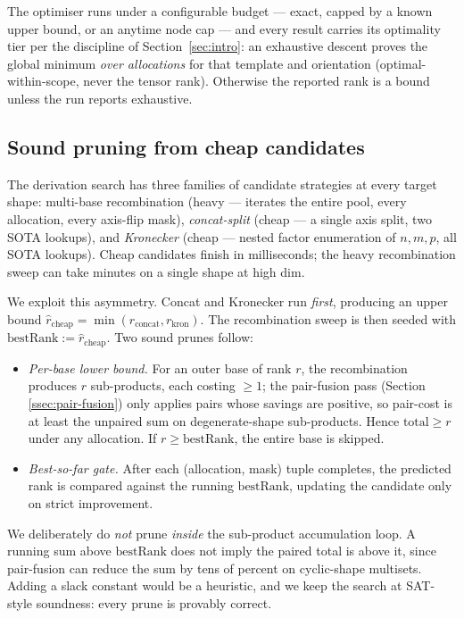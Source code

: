 The optimiser runs under a configurable budget --- exact, capped by a
known upper bound, or an anytime node cap --- and every result carries
its optimality tier per the discipline of Section~\ref{sec:intro}: an
exhaustive descent proves the global minimum \emph{over allocations} for
that template and orientation (optimal-within-scope, never the tensor
rank). Otherwise the reported rank is a bound unless the run reports
exhaustive.

\subsection{Sound pruning from cheap candidates}\label{ssec:cheap-pruning}

The derivation search has three families of candidate strategies
at every target shape: multi-base recombination (heavy --- iterates
the entire pool, every allocation, every axis-flip mask),
\emph{concat-split} (cheap --- a single axis split, two SOTA
lookups), and \emph{Kronecker} (cheap --- nested factor enumeration
of \(n, m, p\), all SOTA lookups). Cheap candidates finish in
milliseconds; the heavy recombination sweep can take minutes on a
single shape at high dim.

We exploit this asymmetry. Concat and Kronecker run \emph{first},
producing an upper bound \(\hat r_{\text{cheap}} = \min(r_{\text{concat}},
r_{\text{kron}})\). The recombination sweep is then seeded with
\(\text{bestRank} := \hat r_{\text{cheap}}\). Two sound prunes follow:

\begin{itemize}[itemsep=2pt]
  \item \emph{Per-base lower bound.} For an outer base of rank \(r\),
    the recombination produces \(r\) sub-products, each costing
    \(\ge 1\); the pair-fusion pass (Section \ref{ssec:pair-fusion})
    only applies pairs whose savings are positive, so pair-cost is
    at least the unpaired sum on degenerate-shape sub-products.
    Hence \(\text{total} \ge r\) under any allocation. If
    \(r \ge \text{bestRank}\), the entire base is skipped.
  \item \emph{Best-so-far gate.} After each (allocation, mask)
    tuple completes, the predicted rank is
    compared against the running \(\text{bestRank}\), updating the
    candidate only on strict improvement.
\end{itemize}

We deliberately do \emph{not} prune \emph{inside} the sub-product
accumulation loop. A running sum above \(\text{bestRank}\) does not
imply the paired total is above it, since pair-fusion can reduce
the sum by tens of percent on cyclic-shape multisets. Adding a
slack constant would be a heuristic, and we keep the search at
SAT-style soundness: every prune is provably correct.

